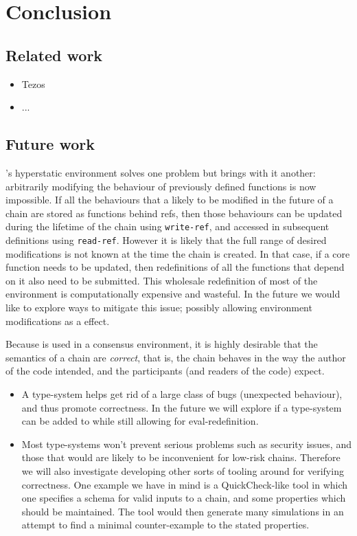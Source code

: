 \section{Conclusion}

\subsection{Related work}

\begin{itemize}
  \item Tezos
  \item ...
\end{itemize}

\subsection{Future work}

\rad's hyperstatic environment solves one problem but brings with it another:
arbitrarily modifying the behaviour of previously defined functions is now
impossible. If all the behaviours that a likely to be modified in the future of
a chain are stored as functions behind refs, then those behaviours can be
updated during the lifetime of the chain using \texttt{write-ref}, and accessed
in subsequent definitions using \texttt{read-ref}. However it is likely that the
full range of desired modifications is not known at the time the chain is
created. In that case, if a core function needs to be updated, then
redefinitions of all the functions that depend on it also need to be submitted.
This wholesale redefinition of most of the environment is computationally
expensive and wasteful. In the future we would like to explore ways to mitigate
this issue; possibly allowing environment modifications as a effect.

Because \rad{} is used in a consensus environment, it is highly desirable that
the semantics of a chain are \emph{correct}, that is, the chain behaves in the
way the author of the code intended, and the participants (and readers of the
code) expect.

\begin{itemize}
\item A type-system helps get rid of a large class of bugs (unexpected
  behaviour), and thus promote correctness. In the future we will explore if a
  type-system can be added to \rad{} while still allowing for eval-redefinition.
\item Most type-systems won't prevent serious problems such as security issues,
  and those that would are likely to be inconvenient for low-risk chains.
  Therefore we will also investigate developing other sorts of tooling around
  \rad{} for verifying correctness. One example we have in mind is a
  QuickCheck-like tool in which one specifies a schema for valid inputs to a
  chain, and some properties which should be maintained. The tool would then
  generate many simulations in an attempt to find a minimal counter-example to
  the stated properties.
\end{itemize}